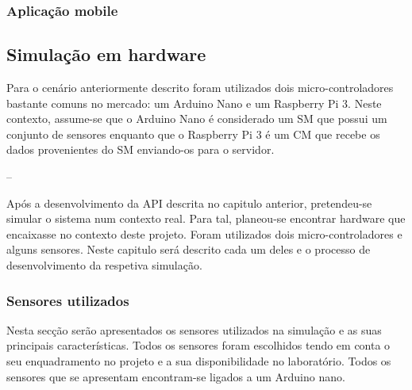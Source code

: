 













\newpage






\subsubsection{Aplicação mobile}




\newpage
\subsection{Simulação em hardware}

Para o cenário anteriormente descrito foram utilizados dois micro-controladores bastante comuns no mercado: um Arduino Nano e um Raspberry Pi 3. Neste contexto, assume-se que o Arduino Nano é considerado um \ac{SM} que possui um conjunto de sensores enquanto que o Raspberry Pi 3 é um \ac{CM} que recebe os dados provenientes do \ac{SM} enviando-os para o servidor. 


--

Após a desenvolvimento da API descrita no capitulo anterior, pretendeu-se simular o sistema num contexto real. Para tal, planeou-se encontrar hardware que encaixasse no contexto deste projeto. Foram utilizados dois micro-controladores e alguns sensores. Neste capitulo será descrito cada um deles e o processo de desenvolvimento da respetiva simulação.  

\newpage

\subsubsection{Sensores utilizados}

Nesta secção serão apresentados os sensores utilizados na simulação e as suas principais características. Todos os sensores foram escolhidos tendo em conta o seu enquadramento no projeto e a sua disponibilidade no laboratório. Todos os sensores que se apresentam encontram-se ligados a um Arduino nano. \\


